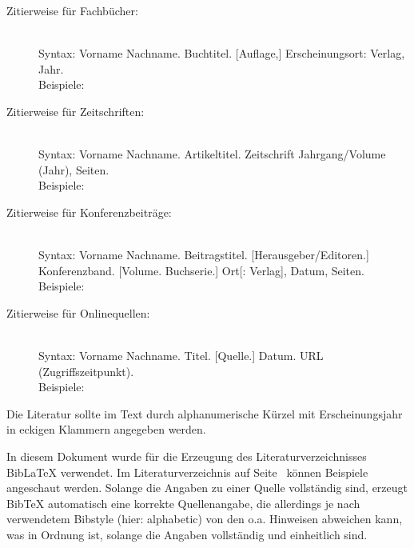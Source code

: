 \documentclass[
    fontsize=12pt,
    headings=small,
    parskip=half,           %
    bibliography=totoc,
    numbers=noenddot,       %
    open=any,               %
    ]{scrreprt}
\begin{document}
\begin{description}

	\item[Zitierweise für Fachbücher:] \mbox{}\\[1ex]
	Syntax: Vorname Nachname. Buchtitel. {[}Auflage,{]} Erscheinungsort: Verlag, Jahr. \\[1ex]
	Beispiele: \cite{Beut2009,ScWe2007,Pfit90}

	\item[Zitierweise für Zeitschriften:] \mbox{}\\[1ex]
	Syntax: Vorname Nachname. Artikeltitel. Zeitschrift Jahrgang/Volume (Jahr), Seiten. \\[1ex]
	Beispiele: \cite{Kili2006,Lamp1981,ThKZ2002,Chau81,Chau88}

	\item[Zitierweise für Konferenzbeiträge:] \mbox{}\\[1ex]
    Syntax: Vorname Nachname. Beitragstitel. {[}Herausgeber/Editoren.{]}
    Konferenzband. {[}Volume. Buchserie.{]} Ort{[: Verlag]}, Datum, Seiten. \\[1ex]
	Beispiele: \cite{InBr2009,WWPK2010,HSFN2009,GoRS99,WaMS2008}

	\item[Zitierweise für Onlinequellen:] \mbox{}\\[1ex]
    Syntax: Vorname Nachname. Titel. {[}Quelle.{]} Datum. URL (Zugriffszeitpunkt). \\[1ex]
	Beispiele: \cite{CCC2009,Heise2011,textwahrnehmung}

\end{description}

Die Literatur sollte im Text durch alphanumerische Kürzel mit Erscheinungsjahr in eckigen Klammern angegeben werden.
%

In diesem Dokument wurde für die Erzeugung des Literaturverzeichnisses BibLaTeX verwendet. Im Literaturverzeichnis auf Seite~\pageref{sec:literaturverzeichnis} können Beispiele angeschaut werden. Solange die Angaben zu einer Quelle vollständig sind, erzeugt BibTeX automatisch eine korrekte Quellenangabe, die allerdings je nach verwendetem Bibstyle (hier: alphabetic) von den o.a. Hinweisen abweichen kann, was in Ordnung ist, solange die Angaben vollständig und einheitlich sind.
\end{document}
